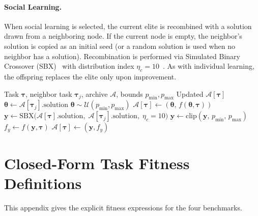 \paragraph{Social Learning.}
When social learning is selected, the current elite is recombined with a solution drawn from a neighboring node. If the current node is empty, the neighbor's solution is copied as an initial seed (or a random solution is used when no neighbor has a solution). Recombination is performed via Simulated Binary Crossover (SBX)~\cite{SBX} with distribution index $\eta_c=10$~\cite{deb2001multi}. As with individual learning, the offspring replaces the elite only upon improvement.

\begin{algorithm}[H]
\caption{Social Learning}\label{alg:social}
\begin{algorithmic}[1]
\Require Task $\boldsymbol{\tau}$, neighbor task $\boldsymbol{\tau}_j$, archive $\mathcal{A}$, bounds $p_{\min}, p_{\max}$
\Ensure Updated $\mathcal{A}[\boldsymbol{\tau}]$
 
        \State $\boldsymbol{\theta} \gets \mathcal{A}[\boldsymbol{\tau}_j].\text{solution}$ 
    \Else
        \State $\boldsymbol{\theta} \sim \mathcal{U}(p_{\min}, p_{\max})$ 
    \EndIf
    \State $\mathcal{A}[\boldsymbol{\tau}] \gets (\boldsymbol{\theta},\, f(\boldsymbol{\theta}, \boldsymbol{\tau}))$
    \State \Return
\EndIf
{}
    \State \Return {}
\EndIf
\State $\mathbf{y} \gets \text{SBX}\bigl(\mathcal{A}[\boldsymbol{\tau}].\text{solution},\; \mathcal{A}[\boldsymbol{\tau}_j].\text{solution},\; \eta_c\!=\!10\bigr)$ 
\State $\mathbf{y} \gets \text{clip}(\mathbf{y},\, p_{\min},\, p_{\max})$
\State $f_y \gets f(\mathbf{y}, \boldsymbol{\tau})$
 
    \State $\mathcal{A}[\boldsymbol{\tau}] \gets (\mathbf{y}, f_y)$
\EndIf
\end{algorithmic}
\end{algorithm}

\section{Closed-Form Task Fitness Definitions}\label{app:tasks}

This appendix gives the explicit fitness expressions for the four benchmarks.

